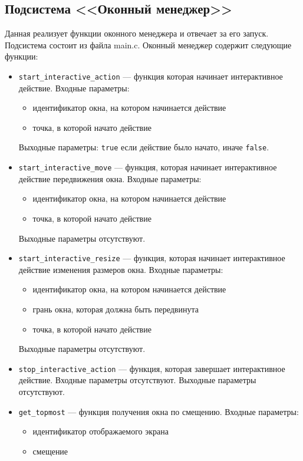 \documentclass[10pt,a4paper]{report}
\begin{document}
\subsection{Подсистема <<Оконный менеджер>>}
Данная реализует функции оконного менеджера и отвечает за его запуск. Подсистема состоит из файла main.c.
Оконный менеджер содержит следующие функции:
\begin{itemize}
\item \texttt{start\_interactive\_action} --- функция которая начинает интерактивное действие. Входные параметры:
	\begin{itemize}
	\item идентификатор окна, на котором начинается действие
	\item точка, в которой начато действие
	\end{itemize}
	
Выходные параметры: \texttt{true} если действие было начато, иначе \texttt{false}.

\item \texttt{start\_interactive\_move} --- функция, которая начинает интерактивное действие передвижения окна. Входные параметры:
	\begin{itemize}
	\item идентификатор окна, на котором начинается действие
	\item точка, в которой начато действие
	\end{itemize}
	
Выходные параметры отсутствуют.

\item \texttt{start\_interactive\_resize} --- функция, которая начинает интерактивное действие изменения размеров окна. Входные параметры:
	\begin{itemize}
	\item идентификатор окна, на котором начинается действие
	\item грань окна, которая должна быть передвинута
	\item точка, в которой начато действие
	\end{itemize}
	
Выходные параметры отсутствуют.

\item \texttt{stop\_interactive\_action} --- функция, которая завершает интерактивное действие. Входные параметры отсутствуют. Выходные параметры отсутствуют.

\item \texttt{get\_topmost} --- функция получения окна по смещению.  Входные параметры:
	\begin{itemize}
	\item идентификатор отображаемого экрана
	\item смещение
	\end{itemize}
	

\end{itemize}
\end{document}
